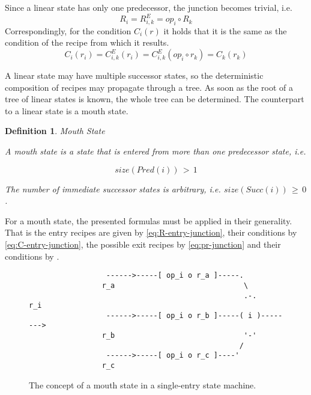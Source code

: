 \documentclass[12pt,a4paper]{scrartcl}
\newtheorem{definition}{Definition}
\begin{document}
Since a linear state has only one predecessor, the junction becomes trivial, i.e.
\begin{equation} \label{eq:composition-complete-recipe}
    R_i      = R^E_{i,k}      = op_i\circ R_k   
\end{equation}
Correspondingly, for the condition $C_i(r)$ it holds that it is the same as the
condition of the recipe from which it results.
\begin{equation} \label{eq:composition-complete-condition}
    C_i(r_i) = C^E_{i,k}(r_i) = C^E_{i,k}(op_i\circ r_k) = C_k(r_k)
\end{equation}

A linear state may have multiple successor states, so the deterministic
composition of recipes may propagate through a tree.  As soon as the root of a
tree of linear states is known, the whole tree can be determined.  The
counterpart to a linear state is a mouth state.

\begin{definition} Mouth State

    A mouth state is a state that is entered from more than one predecessor
    state, i.e.

    \begin{equation}
                               size(Pred(i))\,>\,1
    \end{equation}

    The number of immediate successor states is arbitrary, i.e.
    $size(Succ(i))\,\ge\,0$.

\end{definition}
For a mouth state, the presented formulas must be applied in their generality.
That is the entry recipes are given by \ref{eq:R-entry-junction},  their 
conditions by \ref{eq:C-entry-junction}, the possible exit recipes by 
\ref{eq:pr-junction} and their conditions by \label{eq:c-junction}.

\begin{figure}[htbp] \leavevmode \label{fig:mouth-state}
\begin{verbatim}
                  ------>-----[ op_i o r_a ]-----.
                 r_a                              \
                                                  .-.    r_i
                  ------>-----[ op_i o r_b ]-----( i )--------> 
                 r_b                              '-'
                                                 /
                  ------>-----[ op_i o r_c ]----'
                 r_c 

\end{verbatim}
\caption{The concept of a mouth state in a single-entry state machine.}
\end{figure}
\end{document}
